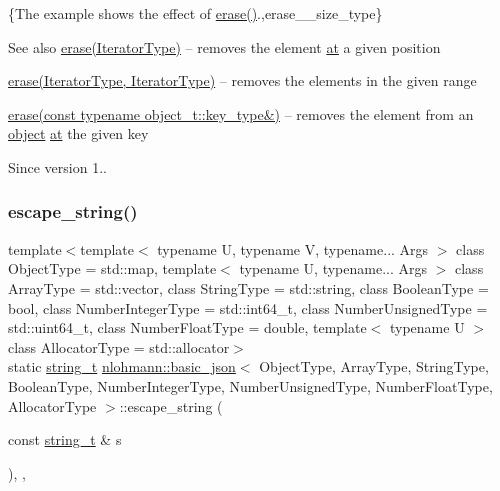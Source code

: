 \{The example shows the effect of {\ttfamily \hyperlink{classnlohmann_1_1basic__json_ab9f8c9a02d6bb794ee26801a232ca4f4}{erase()}}.,erase\+\_\+\+\_\+size\+\_\+type\}

\begin{DoxySeeAlso}{See also}
\hyperlink{classnlohmann_1_1basic__json_ab9f8c9a02d6bb794ee26801a232ca4f4}{erase(\+Iterator\+Type)} -- removes the element \hyperlink{classnlohmann_1_1basic__json_a214a8c22d616fd3567b88932c07436c9}{at} a given position 

\hyperlink{classnlohmann_1_1basic__json_aa8996e3f8cd3e5113dcc3cb34bef7c0a}{erase(\+Iterator\+Type, Iterator\+Type)} -- removes the elements in the given range 

\hyperlink{classnlohmann_1_1basic__json_aa36e72ffc3241b960fe9186d19e03bc3}{erase(const typename object\+\_\+t\+::key\+\_\+type\&)} -- removes the element from an \hyperlink{classnlohmann_1_1basic__json_ad25b2f8c21e241e2d63455537a9294ff}{object} \hyperlink{classnlohmann_1_1basic__json_a214a8c22d616fd3567b88932c07436c9}{at} the given key
\end{DoxySeeAlso}
\begin{DoxySince}{Since}
version 1.. 
\end{DoxySince}
\hypertarget{classnlohmann_1_1basic__json_a287187938417b32a548e476058689d80}{}\label{classnlohmann_1_1basic__json_a287187938417b32a548e476058689d80} 
\subsubsection{\texorpdfstring{escape\+\_\+string()}{escape\_string()}}
{\footnotesize\ttfamily template$<$template$<$ typename U, typename V, typename... Args $>$ class Object\+Type = std\+::map, template$<$ typename U, typename... Args $>$ class Array\+Type = std\+::vector, class String\+Type  = std\+::string, class Boolean\+Type  = bool, class Number\+Integer\+Type  = std\+::int64\+\_\+t, class Number\+Unsigned\+Type  = std\+::uint64\+\_\+t, class Number\+Float\+Type  = double, template$<$ typename U $>$ class Allocator\+Type = std\+::allocator$>$ \\
static \hyperlink{classnlohmann_1_1basic__json_ab63e618bbb0371042b1bec17f5891f42}{string\+\_\+t} \hyperlink{classnlohmann_1_1basic__json}{nlohmann\+::basic\+\_\+json}$<$ Object\+Type, Array\+Type, String\+Type, Boolean\+Type, Number\+Integer\+Type, Number\+Unsigned\+Type, Number\+Float\+Type, Allocator\+Type $>$\+::escape\+\_\+string (\begin{DoxyParamCaption}\item[{const \hyperlink{classnlohmann_1_1basic__json_ab63e618bbb0371042b1bec17f5891f42}{string\+\_\+t} \&}]{s }\end{DoxyParamCaption})\hspace{0.3cm}{\ttfamily [inline]}, {\ttfamily [static]}, {\ttfamily [private]}}



